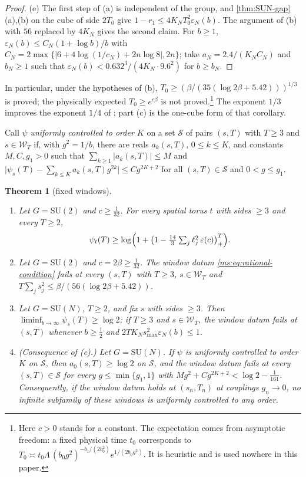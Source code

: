 \documentclass[11pt,a4paper]{amsart}
\newtheorem{theorem}{Theorem}[section]
\theoremstyle{definition}
\theoremstyle{remark}
\numberwithin{equation}{section}
\newcommand{\Wwin}{\mathcal{W}}      %
\newcommand{\abs}[1]{\lvert #1\rvert}      %
\newcommand{\SU}{\mathrm{SU}}              %
\newcommand{\psiT}[2]{\psi_{#1}(#2)}       %
\newcommand{\tzero}{t_0}                   %
\begin{document}
\begin{proof}
(e) The first step of (a) is independent of the group, and \cref{thm:SUN-gap}(a),(b) on the cube of side $2T_0$ give $1-r_1\le4K_NT_0^2\varepsilon_N(b)$. The argument of (b) with $56$ replaced by $4K_N$ gives the second claim. For $b\ge1$, $\varepsilon_N(b)\le C_N(1+\log b)/b$ with $C_N=2\max\{\abs{6+4\log(1/c_N)+2n\log8},2n\}$; take $a_N=2.4/(K_NC_N)$ and $b_N\ge1$ such that $\varepsilon_N(b)<0.632^3/(4K_N\cdot9.6^2)$ for $b\ge b_N$.
\end{proof}

In particular, under the hypotheses of (b), $T_0\ge(\beta/(35(\log2\beta+5.42)))^{1/3}$ is proved; the physically expected $T_0\ge e^{c\beta}$ is not proved.\footnote{Here $c>0$ stands for a constant. The expectation comes from asymptotic freedom: a fixed physical time $\tzero$ corresponds to $T_0\asymp\tzero\Lambda\,(b_0g^2)^{-b_1/(2b_0^2)}e^{1/(2b_0g^2)}$. It is heuristic and is used nowhere in this paper.}
The exponent $1/3$ improves the exponent $1/4$ of \cite[Corollary~6]{bhattacharjee2026first}; part (c) is the one-cube form of that corollary.

Call $\psi$ \emph{uniformly controlled to order $K$} on a set $\mathcal S$ of pairs $(s,T)$ with $T\ge3$ and $s\in\Wwin_T$ if, with $g^2=1/b$, there are reals $a_k(s,T)$, $0\le k\le K$, and constants $M,C,g_1>0$ such that $\sum_{k\ge1}\abs{a_k(s,T)}\le M$ and $\abs{\psiT{s}{T}-\sum_{k\le K}a_k(s,T)g^{2k}}\le Cg^{2K+2}$ for all $(s,T)\in\mathcal S$ and $0<g\le g_1$.

\begin{theorem}[fixed windows]\label{thm:fixed-window}
\leavevmode
\begin{enumerate}[label=\textup{(\alph*)},leftmargin=*]
\item Let $G=\SU(2)$ and $c\ge\frac1{32}$. For every spatial torus $t$ with sides $\ge3$ and every $T\ge2$,
\[
\psiT{t}{T}\ge\log\Bigl(1+\bigl(1-\tfrac{14}3\textstyle\sum_j\ell_j^2\,\varepsilon(c)\bigr)_+^T\Bigr).
\]
\item Let $G=\SU(2)$ and $c=2\beta\ge\frac1{32}$. The window datum \cref{ms:eq:rational-condition} fails at every $(s,T)$ with $T\ge3$, $s\in\Wwin_T$ and $T\sum_js_j^2\le\beta/(56(\log2\beta+5.42))$.
\item Let $G=\SU(N)$, $T\ge2$, and fix $s$ with sides $\ge3$. Then $\liminf_{b\to\infty}\psiT{s}{T}\ge\log2$; if $T\ge3$ and $s\in\Wwin_T$, the window datum fails at $(s,T)$ whenever $b\ge\frac12$ and $2TK_Ns_{\max}^2\varepsilon_N(b)\le1$.
\item \textup{(Consequence of (c).)} Let $G=\SU(N)$. If $\psi$ is uniformly controlled to order $K$ on $\mathcal S$, then $a_0(s,T)\ge\log2$ on $\mathcal S$, and the window datum fails at every $(s,T)\in\mathcal S$ for every $g\le\min\{g_1,1\}$ with $Mg^2+Cg^{2K+2}<\log2-\frac1{161}$. Consequently, if the window datum holds at $(s_n,T_n)$ at couplings $g_n\to0$, no infinite subfamily of these windows is uniformly controlled to any order.
\end{enumerate}
\end{theorem}
\end{document}
